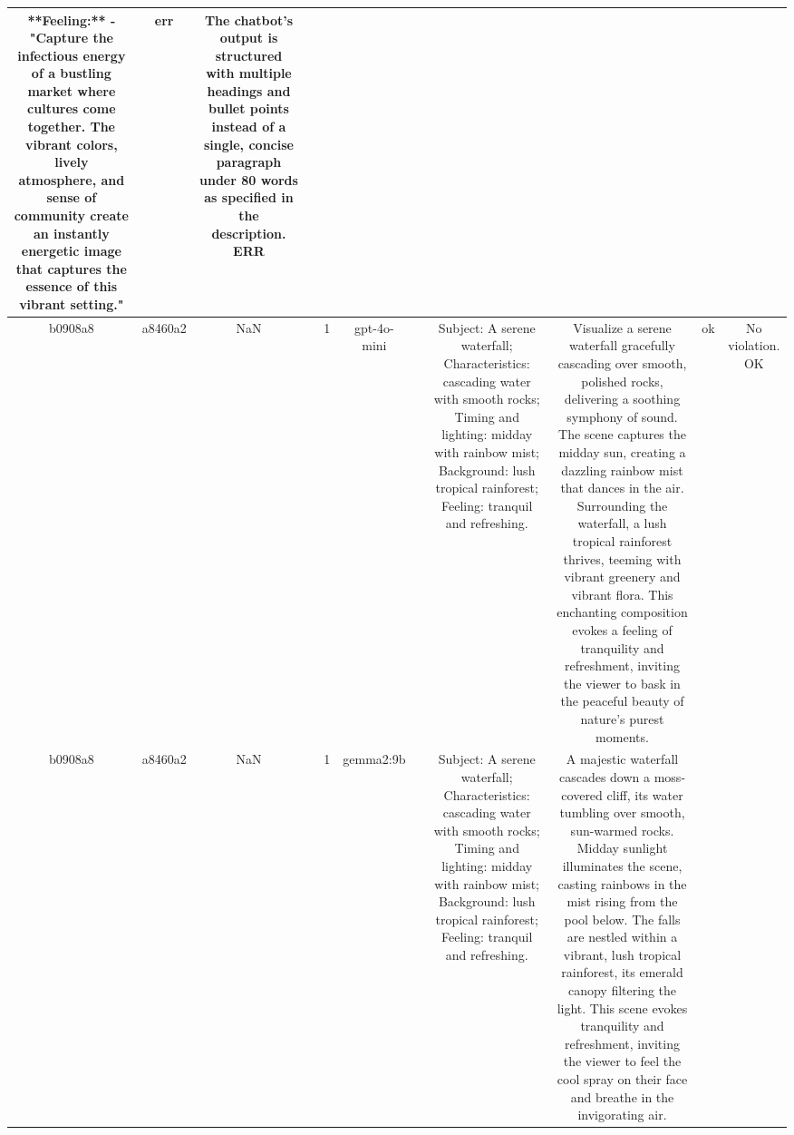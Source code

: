 \begin{table}[h!]
\begin{tabular}{|c|c|c|c|c|c|c|c|c|c|c|}
**Feeling:** 
- "Capture the infectious energy of a bustling market where cultures come together. The vibrant colors, lively atmosphere, and sense of community create an instantly energetic image that captures the essence of this vibrant setting." & err & The chatbot's output is structured with multiple headings and bullet points instead of a single, concise paragraph under 80 words as specified in the description.
ERR\\
\hline
b0908a8 & a8460a2 & NaN &  & 1 & gpt-4o-mini &  & Subject: A serene waterfall; Characteristics: cascading water with smooth rocks; Timing and lighting: midday with rainbow mist; Background: lush tropical rainforest; Feeling: tranquil and refreshing. & Visualize a serene waterfall gracefully cascading over smooth, polished rocks, delivering a soothing symphony of sound. The scene captures the midday sun, creating a dazzling rainbow mist that dances in the air. Surrounding the waterfall, a lush tropical rainforest thrives, teeming with vibrant greenery and vibrant flora. This enchanting composition evokes a feeling of tranquility and refreshment, inviting the viewer to bask in the peaceful beauty of nature’s purest moments. & ok & No violation.
OK\\
\hline
b0908a8 & a8460a2 & NaN &  & 1 & gemma2:9b &  & Subject: A serene waterfall; Characteristics: cascading water with smooth rocks; Timing and lighting: midday with rainbow mist; Background: lush tropical rainforest; Feeling: tranquil and refreshing. & A majestic waterfall cascades down a moss-covered cliff, its water tumbling over smooth, sun-warmed rocks.  Midday sunlight illuminates the scene, casting rainbows in the mist rising from the pool below. The falls are nestled within a vibrant, lush tropical rainforest, its emerald canopy filtering the light. This scene evokes tranquility and refreshment, inviting the viewer to feel the cool spray on their face and breathe in the invigorating air.



\end{tabular}
\end{table}

